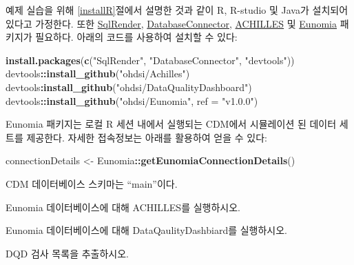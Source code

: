 \documentclass[11pt]{book}
\newenvironment{Shaded}{\begin{snugshade}}{\end{snugshade}}
\newcommand{\KeywordTok}[1]{\textcolor[rgb]{0.13,0.29,0.53}{\textbf{#1}}}
\newcommand{\DataTypeTok}[1]{\textcolor[rgb]{0.13,0.29,0.53}{#1}}
\newcommand{\StringTok}[1]{\textcolor[rgb]{0.31,0.60,0.02}{#1}}
\newcommand{\OperatorTok}[1]{\textcolor[rgb]{0.81,0.36,0.00}{\textbf{#1}}}
\newcommand{\NormalTok}[1]{#1}
\theoremstyle{definition}
\theoremstyle{definition}
\theoremstyle{definition}
\theoremstyle{remark}
\let\BeginKnitrBlock\begin \let\EndKnitrBlock\end
\begin{document}
예제 실습을 위해 \ref{installR}절에서 설명한 것과 같이 R, R-studio 및
Java가 설치되어 있다고 가정한다. 또한
\href{https://ohdsi.github.io/SqlRender/}{SqlRender},
\href{https://ohdsi.github.io/DatabaseConnector/}{DatabaseConnector},
\href{https://github.com/OHDSI/Achilles}{ACHILLES} 및
\href{https://ohdsi.github.io/Eunomia/}{Eunomia} 패키지가 필요하다.
아래의 코드를 사용하여 설치할 수 있다:

\begin{Shaded}
\begin{Highlighting}[]
\KeywordTok{install.packages}\NormalTok{(}\KeywordTok{c}\NormalTok{(}\StringTok{"SqlRender"}\NormalTok{, }\StringTok{"DatabaseConnector"}\NormalTok{, }\StringTok{"devtools"}\NormalTok{))}
\NormalTok{devtools}\OperatorTok{::}\KeywordTok{install_github}\NormalTok{(}\StringTok{"ohdsi/Achilles"}\NormalTok{)}
\NormalTok{devtools}\OperatorTok{:}\KeywordTok{install_github}\NormalTok{(}\StringTok{"ohdsi/DataQualityDashboard"}\NormalTok{)}
\NormalTok{devtools}\OperatorTok{::}\KeywordTok{install_github}\NormalTok{(}\StringTok{"ohdsi/Eunomia"}\NormalTok{, }\DataTypeTok{ref =} \StringTok{"v1.0.0"}\NormalTok{)}
\end{Highlighting}
\end{Shaded}

Eunomia 패키지는 로컬 R 세션 내에서 실행되는 CDM에서 시뮬레이션 된
데이터 세트를 제공한다. 자세한 접속정보는 아래를 활용하여 얻을 수 있다:

\begin{Shaded}
\begin{Highlighting}[]
\NormalTok{connectionDetails <-}\StringTok{ }\NormalTok{Eunomia}\OperatorTok{::}\KeywordTok{getEunomiaConnectionDetails}\NormalTok{()}
\end{Highlighting}
\end{Shaded}

CDM 데이터베이스 스키마는 ``main''이다.

\BeginKnitrBlock{exercise}
\protect\hypertarget{exr:exerciseRunAchilles}{}{\label{exr:exerciseRunAchilles}
}Eunomia 데이터베이스에 대해 ACHILLES를 실행하시오.
\EndKnitrBlock{exercise}

\BeginKnitrBlock{exercise}
\protect\hypertarget{exr:exerciseRunDQD}{}{\label{exr:exerciseRunDQD}
}Eunomia 데이터베이스에 대해 DataQaulityDashbiard를 실행하시오.
\EndKnitrBlock{exercise}

\BeginKnitrBlock{exercise}
\protect\hypertarget{exr:exerciseViewDQD}{}{\label{exr:exerciseViewDQD} }DQD
검사 목록을 추출하시오.
\EndKnitrBlock{exercise}
\end{document}
